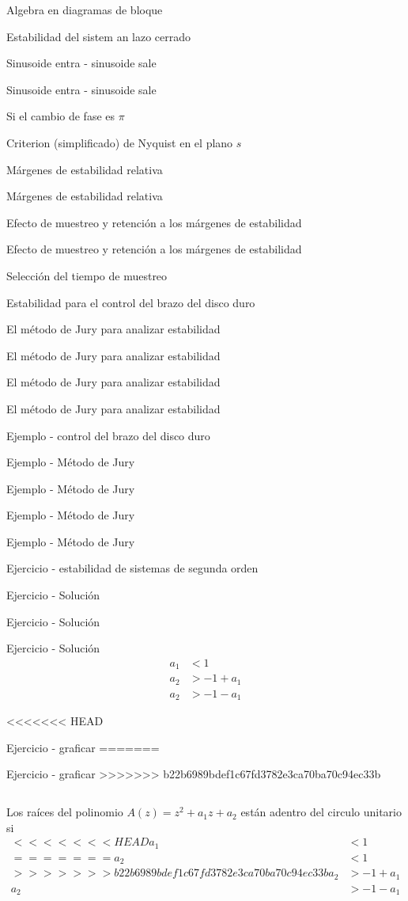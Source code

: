 \documentclass[presentation,aspectratio=169]{beamer}
\begin{document}
\begin{frame}[label={sec:org8e8e439}]{Algebra en diagramas de bloque}
\begin{frame}[label={sec:org5218f19}]{Estabilidad del sistem an lazo cerrado}
\begin{frame}[label={sec:org4ce2307}]{Sinusoide entra - sinusoide sale}
\begin{frame}[label={sec:orgc598966}]{Sinusoide entra - sinusoide sale}
\begin{frame}[label={sec:orgbd54147}]{Si el cambio de fase es \(\pi\)}
\begin{frame}[label={sec:orgf06388b}]{Criterion (simplificado) de Nyquist en el plano \(s\)}
\begin{frame}[label={sec:org5967884}]{Márgenes de estabilidad relativa}
\begin{frame}[label={sec:orgb5ba0e3}]{Márgenes de estabilidad relativa}
\begin{frame}[label={sec:orga8344a9}]{Efecto de muestreo y retención a los márgenes de estabilidad}
\begin{frame}[label={sec:org5e3653d}]{Efecto de muestreo y retención a los márgenes de estabilidad}
\begin{frame}[label={sec:orgd9a9d5d}]{Selección del tiempo de muestreo}
\begin{frame}[label={sec:org2cdebfb}]{Estabilidad para el control del brazo del disco duro}
\begin{frame}[label={sec:org6242817}]{El método de Jury para analizar estabilidad}
\begin{frame}[label={sec:org7c040d1}]{El método de Jury para analizar estabilidad}
\begin{frame}[label={sec:org85b11cd}]{El método de Jury para analizar estabilidad}
\begin{frame}[label={sec:org8bd183d}]{El método de Jury para analizar estabilidad}
\begin{frame}[label={sec:org4ec96eb}]{Ejemplo - control del brazo del disco duro}
\begin{frame}[label={sec:orgd803867}]{Ejemplo - Método de Jury}
\begin{frame}[label={sec:org8c0436d}]{Ejemplo - Método de Jury}
\begin{frame}[label={sec:org7f8ec49}]{Ejemplo - Método de Jury}
\begin{frame}[label={sec:org3031e62}]{Ejemplo - Método de Jury}
\begin{frame}[label={sec:org228180a}]{Ejercicio - estabilidad de sistemas de segunda orden}
\begin{frame}[label={sec:orgef5d44f}]{Ejercicio - Solución}
\begin{frame}[label={sec:orge98726a}]{Ejercicio - Solución}
\begin{frame}[label={sec:orgc054660}]{Ejercicio - Solución}
\begin{align*}
a_1 &< 1\\
a_2 &> -1+a_1\\
a_2 &> -1 - a_1
\end{align*}
\end{frame}

<<<<<<< HEAD
\begin{frame}[label={sec:orgb337b19}]{Ejercicio - graficar}
=======
\begin{frame}[label={sec:org1c4a47e}]{Ejercicio - graficar}
>>>>>>> b22b6989bdef1c67fd3782e3ca70ba70c94ec33b
\begin{columns}
\begin{column}{0.5\columnwidth}
Los raíces del polinomio \(A(z) = z^2 + a_1z + a_2\) están adentro del circulo unitario si
\begin{align*}
<<<<<<< HEAD
a_1 &< 1\\
=======
a_2 &< 1\\
>>>>>>> b22b6989bdef1c67fd3782e3ca70ba70c94ec33b
a_2 &> -1+a_1\\
a_2 &> -1 - a_1

\end{align*}
\end{column}
\end{columns}
\end{frame}
\end{frame}
\end{frame}
\end{frame}
\end{frame}
\end{frame}
\end{frame}
\end{frame}
\end{frame}
\end{frame}
\end{frame}
\end{frame}
\end{frame}
\end{frame}
\end{frame}
\end{frame}
\end{frame}
\end{frame}
\end{frame}
\end{frame}
\end{frame}
\end{frame}
\end{frame}
\end{frame}
\end{frame}
\end{frame}
\end{document}
